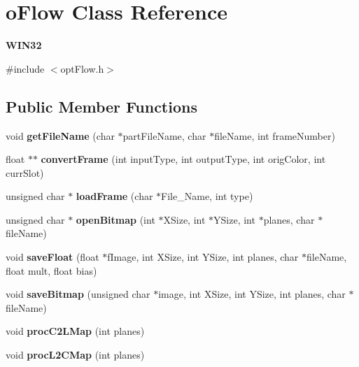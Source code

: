 \section{o\+Flow Class Reference}
\label{classoFlow}


{\bfseries W\+I\+N32}  




{\ttfamily \#include $<$opt\+Flow.\+h$>$}

\subsection*{Public Member Functions}
\begin{DoxyCompactItemize}
\item 
void {\bfseries get\+File\+Name} (char $\ast$part\+File\+Name, char $\ast$file\+Name, int frame\+Number)\label{classoFlow_affca0a8361b05e1e59ba79e3f65c452b}

\item 
float $\ast$$\ast$ {\bfseries convert\+Frame} (int input\+Type, int output\+Type, int orig\+Color, int curr\+Slot)\label{classoFlow_a7dda13b6adaaf5ce2d7de56a71695797}

\item 
unsigned char $\ast$ {\bfseries load\+Frame} (char $\ast$File\+\_\+\+Name, int type)\label{classoFlow_a6f31825de82b2c5be5178029f01a5f01}

\item 
unsigned char $\ast$ {\bfseries open\+Bitmap} (int $\ast$X\+Size, int $\ast$Y\+Size, int $\ast$planes, char $\ast$file\+Name)\label{classoFlow_a500ba81799d1c317d3d345272148dc7c}

\item 
void {\bfseries save\+Float} (float $\ast$f\+Image, int X\+Size, int Y\+Size, int planes, char $\ast$file\+Name, float mult, float bias)\label{classoFlow_aa0b8535ca6f8210efb482e864de4242e}

\item 
void {\bfseries save\+Bitmap} (unsigned char $\ast$image, int X\+Size, int Y\+Size, int planes, char $\ast$file\+Name)\label{classoFlow_a159427806016dad04338fb001574ea78}

\item 
void {\bfseries proc\+C2\+L\+Map} (int planes)\label{classoFlow_aac481e6f9de0fa87b32e490d686be920}

\item 
void {\bfseries proc\+L2\+C\+Map} (int planes)\label{classoFlow_ac0fe8f6389e9849288215f768d3dd238}


\end{DoxyCompactItemize}
